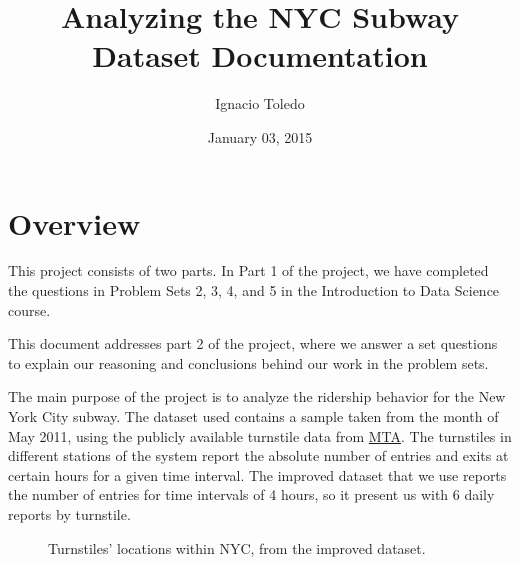 \documentclass[letterpaper,10pt,english]{sphinxmanual}
\title{Analyzing the NYC Subway Dataset Documentation}
\date{January 03, 2015}
\author{Ignacio Toledo}
\begin{document}
\maketitle
\tableofcontents
{}\label{index::doc}



\chapter{Overview}
\label{overview:overview}\label{overview::doc}\label{overview:welcome-to-analyzing-the-nyc-subway-dataset-s-documentation}
This project consists of two parts. In Part 1 of the project, we have completed
the questions in Problem Sets 2, 3, 4, and 5 in the Introduction to
Data Science course.

This document addresses part 2 of the project, where we answer a set questions
to explain our reasoning and conclusions behind our work in the problem sets.

The main purpose of the project is to analyze the ridership behavior for the
New York City subway. The dataset used contains a sample taken from the month
of May 2011, using the publicly available turnstile data from
\href{http://web.mta.info/developers/turnstile.html}{MTA}. The turnstiles in
different stations of the system report the absolute number of entries and exits
at certain hours for a given time interval. The improved dataset that we use
reports the number of entries for time intervals of 4 hours, so it present us
with 6 daily reports by turnstile.
\begin{figure}[htbp]
\centering
\capstart

\caption{Turnstiles' locations within NYC, from the improved dataset.}\end{figure}
\end{document}
